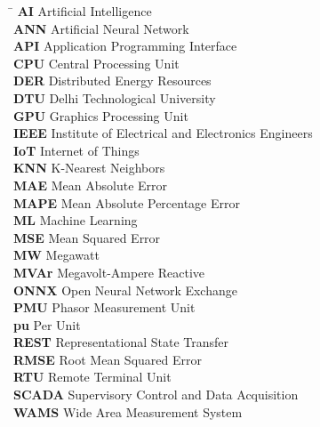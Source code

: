 \documentclass[12pt,a4paper]{report}
\begin{document}
\begin{tabbing}
\hspace{35mm}\=\kill
\textbf{AI} \> Artificial Intelligence \\
\textbf{ANN} \> Artificial Neural Network \\
\textbf{API} \> Application Programming Interface \\
\textbf{CPU} \> Central Processing Unit \\
\textbf{DER} \> Distributed Energy Resources \\
\textbf{DTU} \> Delhi Technological University \\
\textbf{GPU} \> Graphics Processing Unit \\
\textbf{IEEE} \> Institute of Electrical and Electronics Engineers \\
\textbf{IoT} \> Internet of Things \\
\textbf{KNN} \> K-Nearest Neighbors \\
\textbf{MAE} \> Mean Absolute Error \\
\textbf{MAPE} \> Mean Absolute Percentage Error \\
\textbf{ML} \> Machine Learning \\
\textbf{MSE} \> Mean Squared Error \\
\textbf{MW} \> Megawatt \\
\textbf{MVAr} \> Megavolt-Ampere Reactive \\
\textbf{ONNX} \> Open Neural Network Exchange \\
\textbf{PMU} \> Phasor Measurement Unit \\
\textbf{pu} \> Per Unit \\
\textbf{REST} \> Representational State Transfer \\
\textbf{RMSE} \> Root Mean Squared Error \\
\textbf{RTU} \> Remote Terminal Unit \\
\textbf{SCADA} \> Supervisory Control and Data Acquisition \\
\textbf{WAMS} \> Wide Area Measurement System \\
\end{tabbing}

\newpage


\setcounter{page}{1}

\end{document}
